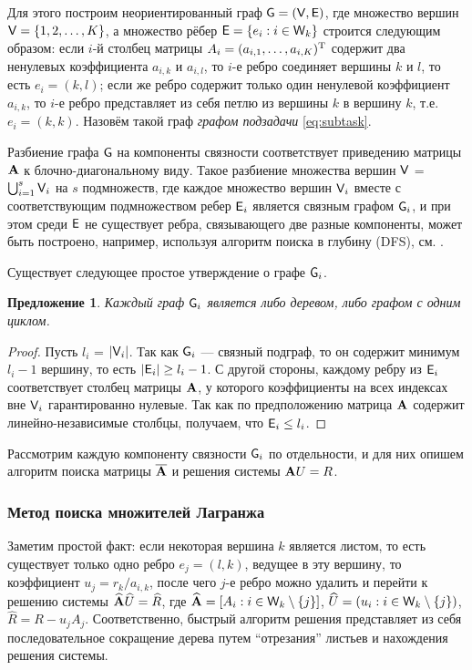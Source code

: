 \documentclass[10pt]{article}
\newtheorem{proposition}{Предложение}
\begin{document}
Для этого построим неориентированный граф $\mathsf{G}=(\mathsf{V}, \mathsf{E})$, где множество вершин $\mathsf{V} = \{1, 2, \ldots, K\}$, а множество рёбер $\mathsf{E} = \{e_i : i \in \mathsf{W}_k \}$ строится следующим образом: если $i$-й столбец матрицы $A_i = (a_{i, 1}, \ldots, a_{i, K})^{\mathrm{T}}$ содержит два ненулевых коэффициента $a_{i,k}$ и $a_{i,l}$, то $i$-е ребро соединяет вершины $k$ и $l$, то есть $e_i = (k, l)$; если же ребро содержит только один ненулевой коэффициент $a_{i,k}$, то $i$-е ребро представляет из себя петлю из вершины $k$ в вершину $k$, т.е. $e_i=(k, k)$. Назовём такой граф \emph{графом подзадачи} \eqref{eq:subtask}.

Разбиение графа $\mathsf{G}$ на компоненты связности соответствует приведению матрицы $\mathbf{A}$ к блочно-диагональному виду. Такое разбиение множества вершин $\mathsf{V}$ = $\bigcup_{i=1}^{s} \mathsf{V}_i$ на $s$ подмножеств, где каждое множество вершин $\mathsf{V}_i$ вместе с соответствующим подмножеством ребер $\mathsf{E}_i$ является связным графом $\mathsf{G}_i$, и при этом среди $\mathsf{E}$ не существует ребра, связывающего две разные компоненты, может быть построено, например, используя алгоритм поиска в глубину (DFS), см. \cite{cormen2009introduction}.

Существует следующее простое утверждение о графе $\mathsf{G}_i$.
\begin{proposition}
Каждый граф $\mathsf{G}_i$ является либо деревом, либо графом с одним циклом.
\end{proposition}
\begin{proof}
Пусть $l_i$ = $|\mathsf{V}_i|$. Так как $\mathsf{G}_i$ --- связный подграф, то он содержит минимум $l_i - 1$ вершину, то есть $|\mathsf{E}_i| \ge l_i - 1$. С другой стороны, каждому ребру из $\mathsf{E}_i$ соответствует столбец матрицы $\mathbf{A}$, у которого коэффициенты на всех индексах вне $\mathsf{V}_i$ гарантированно нулевые. Так как по предположению матрица $\mathbf{A}$ содержит линейно-независимые столбцы, получаем, что $\mathsf{E}_i \le l_i$.
\end{proof}

Рассмотрим каждую компоненту связности $\mathsf{G}_i$ по отдельности, и для них опишем алгоритм поиска матрицы $\overline {\mathbf{A}}$ и решения системы $\mathbf{A} U = R$.
\subsubsection{Метод поиска множителей Лагранжа}
Заметим простой факт: если некоторая вершина $k$ является листом, то есть существует только одно ребро $e_j = (l, k)$, ведущее в эту вершину, то коэффициент $u_j = r_k / a_{i, k}$, после чего $j$-е ребро можно удалить и перейти к решению системы $\widehat {\mathbf{A}} \widehat U = \widehat R$, где $\widehat {\mathbf{A}} = [A_i : i \in \mathsf{W}_k \setminus \{j \}]$, $\widehat U = (u_i : i \in \mathsf{W}_k \setminus \{j \})$, $\widehat R = R - u_j A_j$. Соответственно, быстрый алгоритм решения представляет из себя последовательное сокращение дерева путем ``отрезания'' листьев и нахождения решения системы.
\end{document}
